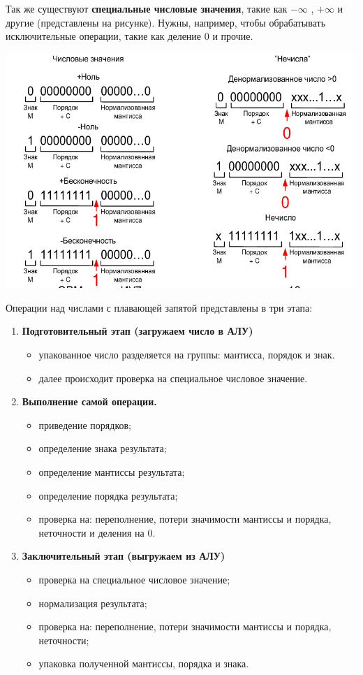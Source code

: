 \documentclass[a4paper,12pt]{article}
\begin{document}
	Так же существуют \textbf{специальные числовые значения}, такие как $-\infty$ , $+\infty$ и другие (представлены на рисунке). Нужны, например, чтобы обрабатывать исключительные операции, такие как деление 0 и прочие.
	
	\begin{center}
		\noindent \includegraphics[scale=0.6]{3.png}\newline
	\end{center}


	Операции над числами с плавающей запятой представлены в три этапа:
	
	\begin{enumerate}
		\item \textbf{Подготовительный этап (загружаем число в АЛУ)}
		\begin{itemize}
			\item упакованное число разделяется на группы: мантисса, порядок и знак.
			\item далее происходит проверка на специальное числовое значение.
		\end{itemize}
		\item \textbf{Выполнение самой операции.}
		\begin{itemize}
			\item приведение порядков;
			\item определение знака результата;
			\item определение мантиссы результата;
			\item определение порядка результата;
			\item проверка на: переполнение, потери значимости мантиссы и порядка, неточности и деления на 0.
		\end{itemize}
		\item \textbf{Заключительный этап (выгружаем из АЛУ)}
		\begin{itemize}
			\item проверка на специальное числовое значение;
			\item нормализация результата;
			\item проверка на: переполнение, потери значимости мантиссы и порядка, неточности;
			\item упаковка полученной мантиссы, порядка и знака.
		\end{itemize}
	\end{enumerate}
\end{document}
